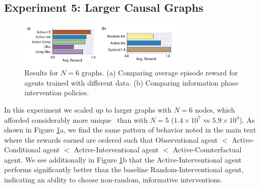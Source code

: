 \subsection{Experiment 5: Larger Causal Graphs}

\begin{figure}[ht!]
\centering
\includegraphics[width=0.7\textwidth]{figures/N6_results_active.pdf} 
\caption{Results for $N=6$ graphs. (a) Comparing average episode reward for agents trained with different data. (b) Comparing information phase intervention policies. }
\label{fig:N6_results}
\end{figure}
In this experiment we scaled up to larger graphs with $N=6$ nodes, which afforded considerably more unique \CBNs~than with $N=5$ ($1.4\times10^7$ vs $5.9\times10^4$). As shown in Figure \ref{fig:N6_results}a, we find the same pattern of behavior noted in the main text where the rewards earned are ordered such that Observational agent $<$ Active-Conditional agent $<$ Active-Interventional agent $<$ Active-Counterfactual agent. We see additionally in Figure \ref{fig:N6_results}b that the Active-Interventional agent performs significantly better than the baseline Random-Interventional agent, indicating an ability to choose non-random, informative interventions.

\newpage
